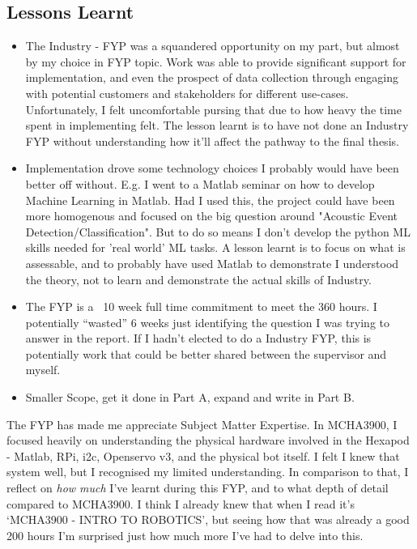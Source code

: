 \documentclass{UoNMCHA}
\newcommand{\inlineQuote}[1]{``#1''}
\numberwithin{equation}{section}
\begin{document}
\subsection{Lessons Learnt}
\begin{itemize}
    \item The Industry - FYP was a squandered opportunity on my part, but almost by my choice in FYP topic. Work was able to provide significant support for implementation, and even the prospect of data collection through engaging with potential customers and stakeholders for different use-cases. Unfortunately, I felt uncomfortable pursing that due to how heavy the time spent in implementing felt.  The lesson learnt is to have not done an Industry FYP without understanding how it'll affect the pathway to the final thesis. 
    \item Implementation drove some technology choices I probably would have been better off without. E.g. I went to a Matlab seminar on how to develop Machine Learning in Matlab. Had I used this, the project could have been more homogenous and focused on the big question around "Acoustic Event Detection/Classification". But to do so means I don't develop the python ML skills needed for 'real world' ML tasks. A lesson learnt is to focus on what is assessable, and to probably have used Matlab to demonstrate I understood the theory, not to learn and demonstrate the actual skills of Industry.
    \item The FYP is a ~10 week full time commitment to meet the 360 hours. I potentially \inlineQuote{wasted} 6 weeks just identifying the question I was trying to answer in the report. If I hadn't elected to do a Industry FYP, this is potentially work that could be better shared between the supervisor and myself.
    \item Smaller Scope, get it done in Part A, expand and write in Part B.
\end{itemize}

The FYP has made me appreciate Subject Matter Expertise. In MCHA3900, I focused heavily on understanding the physical hardware involved in the Hexapod - Matlab, RPi, i2c, Openservo v3, and the physical bot itself. I felt I knew that system well, but I recognised my limited understanding. In comparison to that, I reflect on \textit{how much} I've learnt during this FYP, and to what depth of detail compared to MCHA3900. I think I already knew that when I read it's `MCHA3900 - INTRO TO ROBOTICS', but seeing how that was already a good 200 hours I'm surprised just how much more I've had to delve into this.
\end{document}
